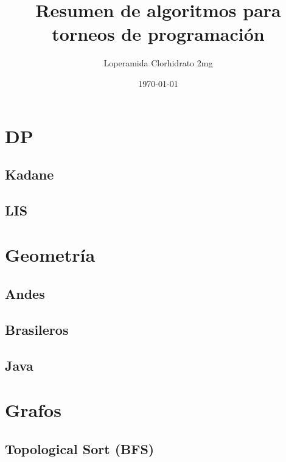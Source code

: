 \documentclass[10pt,letterpaper,twocolumn,twosided]{article}
\newcommand{\codigofuente}[1]{

\dotfill
}
\begin{document}
\title{Resumen de algoritmos para torneos de programación}
\author{Loperamida Clorhidrato 2mg}
\date{\today}
\maketitle

\tableofcontents
{}
\section{DP}
\subsection{Kadane}
\codigofuente{./dp/kadane.cpp}
\subsection{LIS}
\codigofuente{./dp/lis.cpp}
\section{Geometría}
\subsection{Andes}
\codigofuente{./geometria/geometria.cpp}
\subsection{Brasileros}
\codigofuente{./geometria/geo.cpp}
\subsection{Java}
\codigofuente{./geometria/geojava.java}

\section{Grafos}
\subsection{Topological Sort (BFS)}
\codigofuente{./graphs/topological_sort.cpp}
\end{document}
